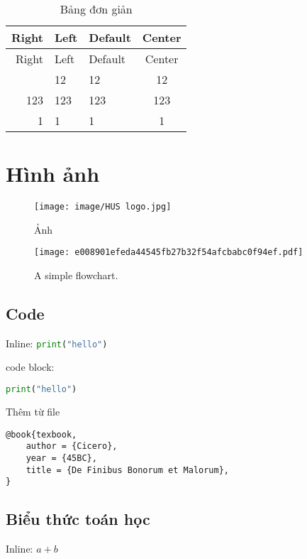 \documentclass[14pt,oneside]{scrbook}
\newcommand{\passthrough}[1]{#1}
\begin{document}
\begin{longtable}[]{|r|l|l|c|}
\caption{Bảng đơn giản}\tabularnewline
\toprule\noalign{}
Right & Left & Default & Center \\
\midrule\noalign{}
\endfirsthead
\toprule\noalign{}
Right & Left & Default & Center \\
\midrule\noalign{}
\endhead
\bottomrule\noalign{}
\endlastfoot
12 & 12 & 12 & 12 \\
\midrule
123 & 123 & 123 & 123 \\
\midrule
1 & 1 & 1 & 1 \\
\end{longtable}

\section{Hình ảnh}\label{huxecnh-ux1ea3nh}

\begin{figure}
\centering
\texttt{[image: image/HUS logo.jpg]}
\caption{Ảnh}
\end{figure}

\begin{figure}
\centering
\texttt{[image: e008901efeda44545fb27b32f54afcbabc0f94ef.pdf]}
\caption{A simple flowchart.}
\end{figure}

\subsection{Code}\label{code}

Inline: \passthrough{\lstinline[language=Python]!print("hello")!}

code block:

\begin{lstlisting}[language=Python, caption={hello world}]
print("hello")
\end{lstlisting}

Thêm từ file

\begin{lstlisting}
@book{texbook,
    author = {Cicero},
    year = {45BC},
    title = {De Finibus Bonorum et Malorum},
}
\end{lstlisting}

\subsection{Biểu thức toán
học}\label{biux1ec3u-thux1ee9c-touxe1n-hux1ecdc}

Inline: \(a+b\)
\end{document}
